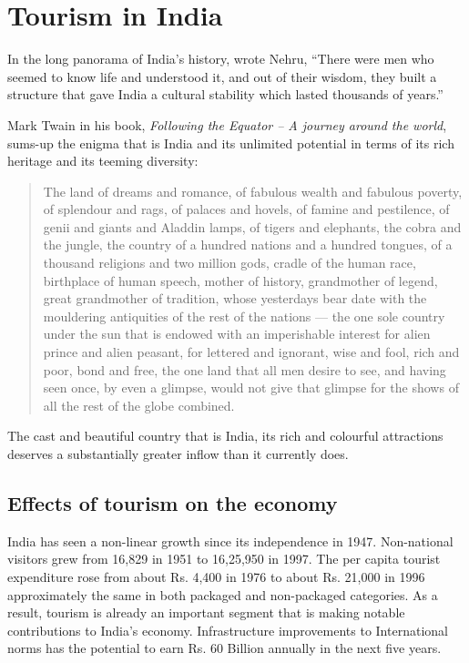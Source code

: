 \section{Tourism in India} %
\label{sec:tii}

In the long panorama of India's history, wrote Nehru, ``There were men who seemed to know life and understood it, and out of their wisdom, they built a structure that gave India a cultural stability which lasted thousands of years.''

Mark Twain in his book, \emph{Following the Equator -- A journey around the world}, sums-up the enigma that is India and its unlimited potential in terms of its rich heritage and its teeming diversity: 

\begin{quote}
  The land of dreams and romance, of fabulous wealth and fabulous poverty, of splendour and rags, of palaces and hovels, of famine and pestilence, of genii and giants and Aladdin lamps, of tigers and elephants, the cobra and the jungle, the country of a hundred nations and a hundred tongues, of a thousand religions and two million gods, cradle of the human race, birthplace of human speech, mother of history, grandmother of legend, great grandmother of tradition, whose yesterdays bear date with the mouldering antiquities of the rest of the nations --- the one sole country under the sun that is endowed with an imperishable interest for alien prince and alien peasant, for lettered and ignorant, wise and fool, rich and poor, bond and free, the one land that all men desire to see, and having seen once, by even a glimpse, would not give that glimpse for the shows of all the rest of the globe combined.
\end{quote}

\noindent The cast and beautiful country that is India, its rich and colourful attractions deserves a substantially greater inflow than it currently does.

\subsection{Effects of tourism on the economy} %
\label{sub:etoe}

India has seen a non-linear growth since its independence in 1947. Non-national visitors grew from 16,829 in 1951 to 16,25,950 in 1997. The per capita tourist expenditure rose from about Rs. 4,400 in 1976 to about Rs. 21,000 in 1996 approximately the same in both packaged and non-packaged categories. As a result, tourism is already an important segment that is making notable contributions to India's economy. Infrastructure improvements to International norms has the potential to earn Rs. 60 Billion annually in the next five years.

